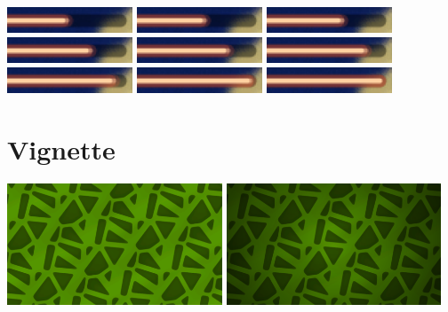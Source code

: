 \documentclass[10pt]{book}
\begin{document}
\begin{CJK}{UTF8}{gkai}
\begin{center}
\includegraphics[width=0.28\textwidth]{assets/ns-pwr-0000.png}
\includegraphics[width=0.28\textwidth]{assets/ns-pwr-0001.png}
\includegraphics[width=0.28\textwidth]{assets/ns-pwr-0002.png}
\includegraphics[width=0.28\textwidth]{assets/ns-pwr-0003.png}
\includegraphics[width=0.28\textwidth]{assets/ns-pwr-0004.png}
\includegraphics[width=0.28\textwidth]{assets/ns-pwr-0005.png}
\includegraphics[width=0.28\textwidth]{assets/ns-pwr-0006.png}
\includegraphics[width=0.28\textwidth]{assets/ns-pwr-0007.png}
\includegraphics[width=0.28\textwidth]{assets/ns-pwr-0008.png}
\end{center}

\newpage
\section{Vignette}

\begin{center}
\includegraphics[width=0.48\textwidth]{assets/vignette-0.png}
\includegraphics[width=0.48\textwidth]{assets/vignette-1.png}
\end{center}


\end{CJK}
\end{document}
